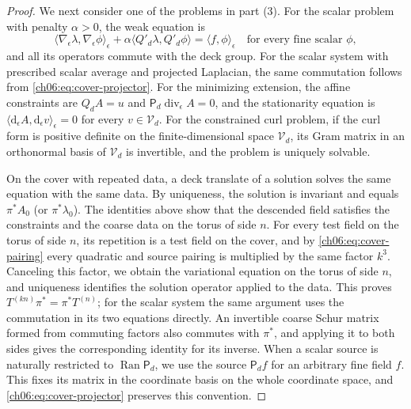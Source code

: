 \begin{proof}
We next consider one of the problems in part (3). For the scalar problem with penalty $\alpha>0$, the weak equation is
\[
 \langle\nabla_\epsilon\lambda,\nabla_\epsilon\phi\rangle_\epsilon+\alpha\langle Q'_d\lambda,Q'_d\phi\rangle=\langle f,\phi\rangle_\epsilon\quad\text{for every fine scalar }\phi,
\]
and all its operators commute with the deck group. For the scalar system with prescribed scalar average and projected Laplacian, the same commutation follows from \eqref{ch06:eq:cover-projector}. For the minimizing extension, the affine constraints are $Q_dA=u$ and $\mathsf P_d\operatorname{div}_\epsilon A=0$, and the stationarity equation is $\langle\mathrm d_\epsilon A,\mathrm d_\epsilon v\rangle_\epsilon=0$ for every $v\in\mathcal V_d$. For the constrained curl problem, if the curl form is positive definite on the finite-dimensional space $\mathcal V_d$, its Gram matrix in an orthonormal basis of $\mathcal V_d$ is invertible, and the problem is uniquely solvable.

On the cover with repeated data, a deck translate of a solution solves the same equation with the same data. By uniqueness, the solution is invariant and equals $\pi^*A_0$ (or $\pi^*\lambda_0$). The identities above show that the descended field satisfies the constraints and the coarse data on the torus of side $n$. For every test field on the torus of side $n$, its repetition is a test field on the cover, and by \eqref{ch06:eq:cover-pairing} every quadratic and source pairing is multiplied by the same factor $k^3$. Canceling this factor, we obtain the variational equation on the torus of side $n$, and uniqueness identifies the solution operator applied to the data. This proves $T^{(kn)}\pi^*=\pi^*T^{(n)}$; for the scalar system the same argument uses the commutation in its two equations directly. An invertible coarse Schur matrix formed from commuting factors also commutes with $\pi^*$, and applying it to both sides gives the corresponding identity for its inverse. When a scalar source is naturally restricted to $\operatorname{Ran}\mathsf P_d$, we use the source $\mathsf P_df$ for an arbitrary fine field $f$. This fixes its matrix in the coordinate basis on the whole coordinate space, and \eqref{ch06:eq:cover-projector} preserves this convention.


\end{proof}
